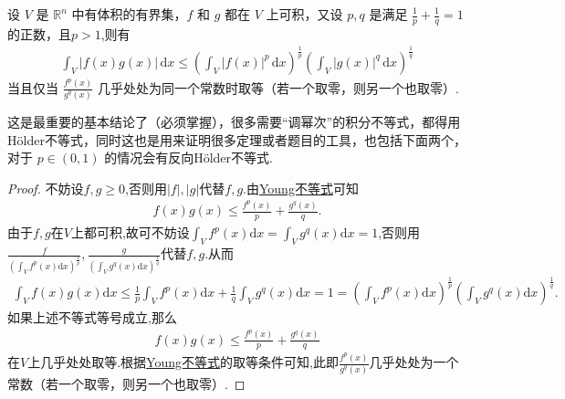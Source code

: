\documentclass[../../main.tex]{subfiles}%
\begin{document}
\begin{theorem}[Hölder不等式]\label{theorem:Hölder(H\"older)不等式(积分形式)}
设 $V$ 是 $\mathbb{R}^n$ 中有体积的有界集，$f$ 和 $g$ 都在 $V$ 上可积，又设 $p,q$ 是满足 $\frac{1}{p} + \frac{1}{q} = 1$ 的正数，且$p>1$,则有
\begin{align*}
\int_V |f(x)g(x)| \, \mathrm{d}x \leqslant \left( \int_V |f(x)|^p \, \mathrm{d}x \right)^{\frac{1}{p}} \left( \int_V |g(x)|^q \, \mathrm{d}x \right)^{\frac{1}{q}}
\end{align*}
当且仅当 $\frac{f^p(x)}{g^q(x)}$ 几乎处处为同一个常数时取等（若一个取零，则另一个也取零）.
\end{theorem}
\begin{remark}
这是最重要的基本结论了（必须掌握），很多需要“调幂次”的积分不等式，都得用H\"older不等式，同时这也是用来证明很多定理或者题目的工具，也包括下面两个，对于 $p \in (0,1)$ 的情况会有反向H\"older不等式.
\end{remark}
\begin{proof}
不妨设$f,g\geqslant 0$,否则用$|f|,|g|$代替$f,g$.由\hyperref[theorem:Young不等式]{Young不等式}可知
\begin{align*}
f(x)g(x) \leqslant \frac{f^p(x)}{p}+\frac{g^q(x)}{q}.
\end{align*}
由于$f,g$在$V$上都可积,故可不妨设$\int_V f^p(x) \mathrm{d}x=\int_V g^q(x) \mathrm{d}x=1$,否则用$\frac{f}{\left( \int_V f^p(x) \mathrm{d}x \right)^{\frac{1}{p}}},\frac{g}{\left( \int_V g^q(x) \mathrm{d}x \right)^{\frac{1}{q}}}$代替$f,g$.从而
\begin{align*}
\int_V f(x)g(x) \mathrm{d}x \leqslant \frac{1}{p}\int_V f^p(x) \mathrm{d}x+\frac{1}{q}\int_V g^q(x) \mathrm{d}x=1=\left( \int_V f^p(x) \mathrm{d}x \right)^{\frac{1}{p}}\left( \int_V g^q(x) \mathrm{d}x \right)^{\frac{1}{q}}.
\end{align*}
如果上述不等式等号成立,那么
\begin{align*}
f(x)g(x) \leqslant \frac{f^p(x)}{p}+\frac{g^q(x)}{q}
\end{align*}
在$V$上几乎处处取等.根据\hyperref[theorem:Young不等式]{Young不等式}的取等条件可知,此即$\frac{f^p(x)}{g^q(x)}$几乎处处为一个常数（若一个取零，则另一个也取零）.
\end{proof}
\end{document}
